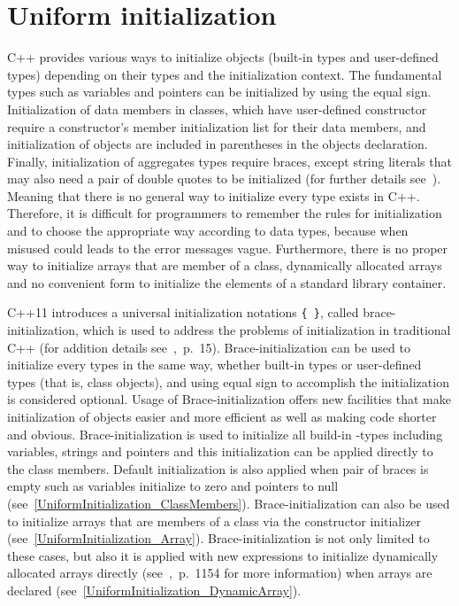 \documentclass[11pt]{report}
\begin{document}
\section{Uniform initialization}
\label{section:Uniform initialization}
C++ provides various ways to initialize objects (built-in types and user-defined types) depending on their types and the initialization context. The fundamental types such as variables and pointers can be initialized by using the equal sign. Initialization of data members in classes, which have user-defined constructor require a constructor's member initialization list for their data members, and initialization of objects are included in parentheses in the objects declaration. Finally, initialization of aggregates types require braces, except string literals that may also need a pair of double quotes to be initialized (for further details see~\cite{Stroustrup:2012:Cpp11}). Meaning that there is no general way to initialize every type exists in C++. Therefore, it is difficult for programmers to remember the rules for initialization and to choose the appropriate way according to data types, because when misused could leads to the error messages vague. Furthermore, there is no proper way to initialize arrays that are member of a class, dynamically allocated arrays and no convenient form to initialize the elements of a standard library container.

C++11 introduces a universal initialization notations \texttt{\{ \}}, called brace-initialization, which is used to address the problems of initialization in traditional C++ (for addition details see~\cite{Reddy:2011:API},~p.~15). Brace-initialization can be used to initialize every types in the same way, whether built-in types or user-defined types (that is, class objects), and using equal sign to accomplish the initialization is considered optional. Usage of Brace-initialization offers new facilities that make initialization of objects easier and more efficient as well as making code shorter and obvious.
Brace-initialization is used to initialize all build-in -types including variables, strings and pointers and this initialization can be applied directly to the class members. Default initialization is also applied when pair of braces is empty such as variables initialize to zero and pointers to null (see~\ref{UniformInitialization_ClassMembers}). Brace-initialization can also be used to initialize arrays that are members of a class via the constructor initializer (see~\ref{UniformInitialization_Array}). Brace-initialization is not only limited to these cases, but also it is applied with new expressions to initialize dynamically allocated arrays directly (see~\cite{Prata:2012:Cpp},~p.~1154 for more information) when arrays are declared (see~\ref{UniformInitialization_DynamicArray}).
\end{document}
